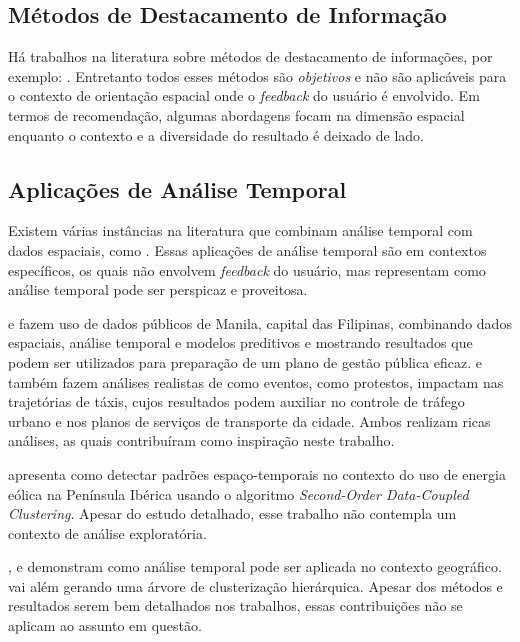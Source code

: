 \subsection{Métodos de Destacamento de Informação}


Há trabalhos na literatura sobre métodos de destacamento de informações, por exemplo: . Entretanto todos esses métodos são {\em objetivos} e não são aplicáveis para o contexto de orientação espacial onde o {\em feedback} do usuário é envolvido. Em termos de recomendação, algumas abordagens focam na dimensão espacial \cite{Bao2015,Levandoski:2012} enquanto o contexto e a diversidade do resultado é deixado de lado.

\subsection{Aplicações de Análise Temporal}

Existem várias instâncias na literatura que combinam análise temporal com dados espaciais, como . Essas aplicações de análise temporal são em contextos específicos, os quais não envolvem {\em feedback} do usuário, mas representam como análise temporal pode ser perspicaz e proveitosa.

 e  fazem uso de dados públicos de Manila, capital das Filipinas, combinando dados espaciais, análise temporal e modelos preditivos e mostrando resultados que podem ser utilizados para preparação de um plano de gestão pública eficaz.  e  também fazem análises realistas de como eventos, como protestos, impactam nas trajetórias de táxis, cujos resultados podem auxiliar no controle de tráfego urbano e nos planos de serviços de transporte da cidade. Ambos realizam ricas análises, as quais contribuíram como inspiração neste trabalho.

 apresenta como detectar padrões espaço-temporais no contexto do uso de energia eólica na Península Ibérica usando o algoritmo {\em Second-Order Data-Coupled Clustering}. Apesar do estudo detalhado, esse trabalho não contempla um contexto de análise exploratória.

,  e  demonstram como análise temporal pode ser aplicada no contexto geográfico.  vai além gerando uma árvore de clusterização hierárquica. Apesar dos métodos e resultados serem bem detalhados nos trabalhos, essas contribuições não se aplicam ao assunto em questão.

